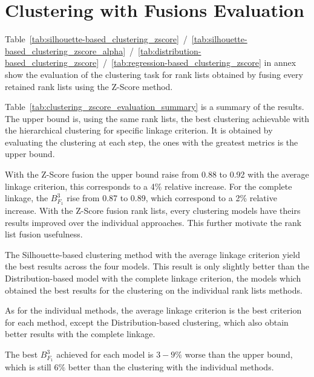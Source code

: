 \section{Clustering with Fusions Evaluation}

Table~\ref{tab:silhouette-based_clustering_zscore}~/~\ref{tab:silhouette-based_clustering_zscore_alpha}~/~\ref{tab:distribution-based_clustering_zscore}~/~\ref{tab:regression-based_clustering_zscore} in annex show the evaluation of the clustering task for rank lists obtained by fusing every retained rank lists using the Z-Score method.

Table~\ref{tab:clustering_zscore_evaluation_summary} is a summary of the results.
The upper bound is, using the same rank lists, the best clustering achievable with the hierarchical clustering for specific linkage criterion.
It is obtained by evaluating the clustering at each step, the ones with the greatest metrics is the upper bound.

With the Z-Score fusion the upper bound raise from 0.88 to 0.92 with the average linkage criterion, this corresponds to a 4\% relative increase.
For the complete linkage, the $B^{3}_{F_1}$ rise from 0.87 to 0.89, which correspond to a 2\% relative increase.
With the Z-Score fusion rank lists, every clustering models have theirs results improved over the individual approaches.
This further motivate the rank list fusion usefulness.

The Silhouette-based clustering method with the average linkage criterion yield the best results across the four models.
This result is only slightly better than the Distribution-based model with the complete linkage criterion, the models which obtained the best results for the clustering on the individual rank lists methods.

As for the individual methods, the average linkage criterion is the best criterion for each method, except the Distribution-based clustering, which also obtain better results with the complete linkage.

The best $B^{3}_{F_1}$ achieved for each model is $3-9\%$ worse than the upper bound, which is still $6\%$ better than the clustering with the individual methods.

